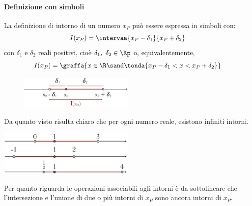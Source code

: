 % 

\paragraph{Definizione con simboli}

La definizione di intorno di un numero \(x_P\) può essere espressa in simboli 
con:
\[I(x_P)=\intervaa{x_P-\delta_1}{x_P+\delta_2}\]
con \(\delta_1\) e \(\delta_2\) reali positivi, cioè 
\(\delta_1,~ \delta_2 \in \Rp\) o, equivalentemente,
\[%
I(x_P)=\graffa{x \in \R \sand \tonda{x_P-\delta_1 < x < x_P+\delta_2}}\]

\begin{figure}[h!]
\centering

\includegraphics[width=0.5\textwidth]{img/top_1.png}%
\end{figure}
  
Da quanto visto risulta chiaro che per ogni numero reale, esistono infiniti 
intorni.

\begin{center}
\includegraphics[width=0.5\textwidth]{img/top_7.png}%
\end{center}
Per quanto riguarda le operazioni associabili agli intorni è da sottolineare 
che l'intersezione e l'unione di due o più intorni di \(x_P\) sono ancora 
intorni di \(x_P\).

  

